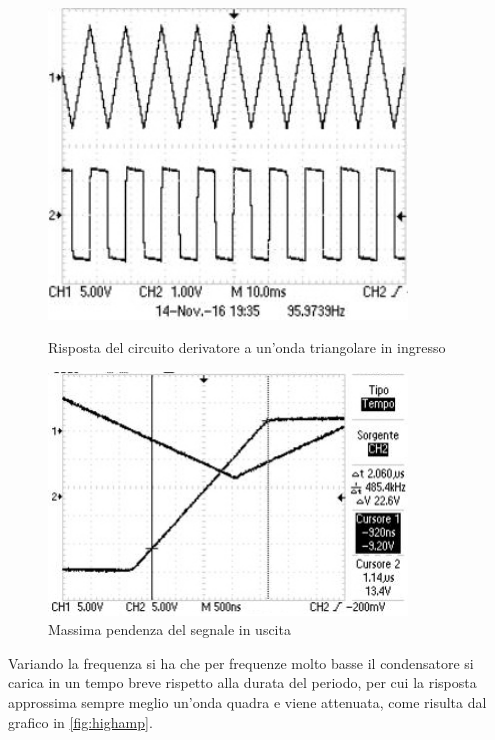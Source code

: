 \documentclass[10pt,a4paper]{article}
\begin{document}
\begin{figure}[H]
\centering
	\begin{minipage}[c]{0.49\textwidth}
		\centering
		\includegraphics[width=0.85\textwidth]{../oscilloscopio/trdev.jpg}
		\caption{Risposta del circuito derivatore a un'onda triangolare in ingresso}
		\label{fig:trdev}
	\end{minipage}
	\begin{minipage}[c]{0.49\textwidth}
		\centering
		\includegraphics[width=0.85\textwidth]{../oscilloscopio/slewperf.jpg}
		\caption{Massima pendenza del segnale in uscita}
		\label{fig:slewperf}
	\end{minipage}
\end{figure}

Variando la frequenza si ha che per frequenze molto basse il condensatore si carica in un tempo breve rispetto alla durata del periodo, per cui la risposta approssima sempre meglio un'onda quadra e viene attenuata, come risulta dal grafico in \figurename{\ref{fig:highamp}}.
\end{document}
